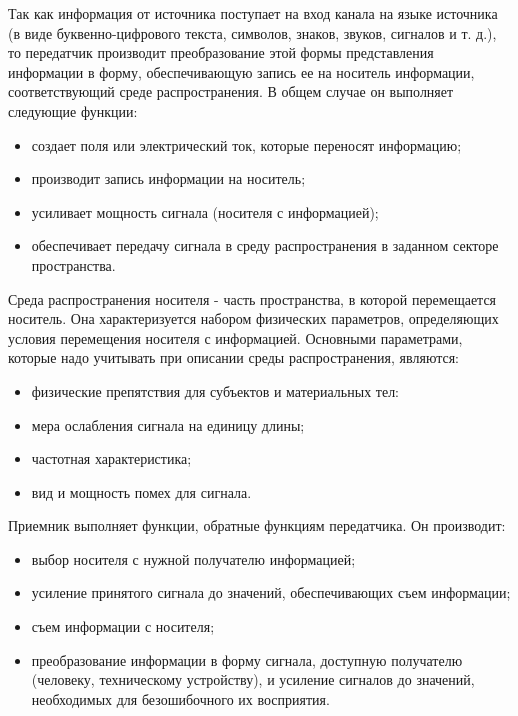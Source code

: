 Так как информация от источника поступает на вход канала на языке источника (в виде буквенно-цифрового текста, символов, знаков, звуков, сигналов и т. д.), то передатчик производит преобразование этой формы представления информации в форму, обеспечивающую запись ее на носитель информации, соответствующий среде распространения. В общем случае он выполняет следующие функции:

\begin{itemize}
	\item создает поля или электрический ток, которые переносят информацию;
	\item производит запись информации на носитель;
	\item 	усиливает мощность сигнала (носителя с информацией);
	\item 	обеспечивает передачу сигнала в среду распространения в заданном секторе пространства.
\end{itemize}

Среда распространения носителя - часть пространства, в которой перемещается носитель. Она характеризуется набором физических параметров, определяющих условия перемещения носителя с информацией. Основными параметрами, которые надо учитывать при описании среды распространения, являются:

\begin{itemize}
	\item физические препятствия для субъектов и материальных тел:
	\item мера ослабления сигнала на единицу длины;
	\item 	частотная характеристика;
	\item 	вид и мощность помех для сигнала.
\end{itemize}

Приемник выполняет функции, обратные функциям передатчика. Он производит:

\begin{itemize}
\item выбор носителя с нужной получателю информацией;
\item усиление принятого сигнала до значений, обеспечивающих съем информации;
\item съем информации с носителя;
\item преобразование информации в форму сигнала, доступную получателю (человеку, техническому устройству), и усиление сигналов до значений, необходимых для безошибочного их восприятия.
\end{itemize}
